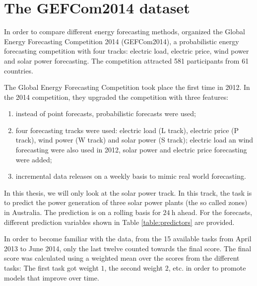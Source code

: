\section{The GEFCom2014 dataset}

In order to compare different energy forecasting methods, 
\Textcite{Hong2016} organized the Global Energy Forecasting Competition 2014 (GEFCom2014), 
a probabilistic energy forecasting competition with four tracks: 
electric load, electric price, wind power and solar power forecasting. 
The competition attracted 581 participants from 61 countries. 

The Global Energy Forecasting Competition took place the first time in 2012. 
In the 2014 competition, they upgraded the competition with three features: 
\begin{enumerate}
    \item instead of point forecasts, probabilistic forecasts were used;
    \item four forecasting tracks were used: electric load (L track), 
    electric price (P track), wind power (W track) and solar power (S track);
    electric load an wind forecasting were also used in 2012, solar power and 
    electric price forecasting were added;
    \item incremental data releases on a weekly basis to mimic real world forecasting.
\end{enumerate}

In this thesis, we will only look at the solar power track. 
In this track, the task is to predict the power generation of three 
solar power plants (the so called zones) in Australia. 
The prediction is on a rolling basis for \(\SI{24}{\hour}\) ahead. 
For the forecasts, different prediction variables shown in Table \ref{table:predictors} 
are provided.

In order to become familiar with the data, from the 15 available tasks from April 2013 to June 2014, 
only the last twelve counted towards the final score. 
The final score was calculated using a weighted mean over the scores from the different tasks: 
The first task got weight \(1\), the second weight \(2\), etc. in order to promote models that improve over time.


